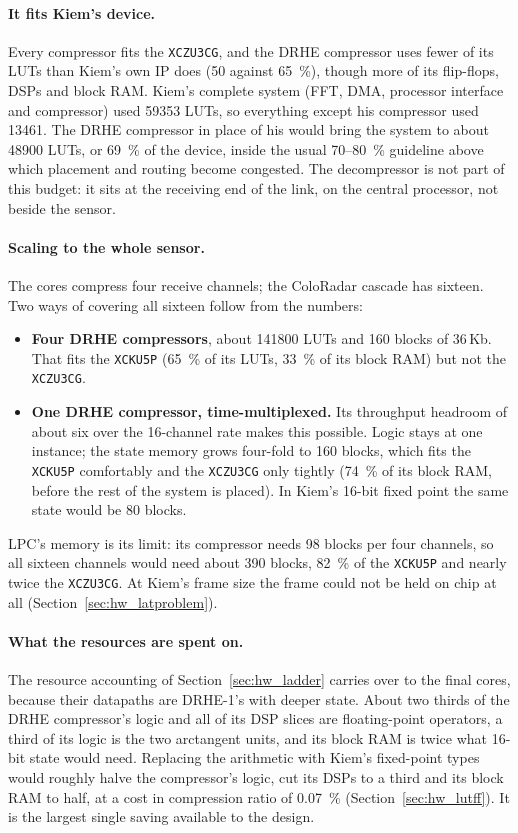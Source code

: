 \paragraph{It fits Kiem's device.} Every compressor fits the \texttt{XCZU3CG},
and the DRHE compressor uses fewer of its LUTs than Kiem's own IP does (50
against \SI{65}{\percent}), though more of its flip-flops, DSPs and block RAM.
Kiem's complete system (FFT, DMA, processor interface and compressor) used
\num{59353} LUTs, so everything except his compressor used \num{13461}. The DRHE
compressor in place of his would bring the system to about \num{48900} LUTs, or
\SI{69}{\percent} of the device, inside the usual 70--\SI{80}{\percent} guideline
above which placement and routing become congested. The decompressor is not
part of this budget: it sits at the receiving end of the link, on the central
processor, not beside the sensor.

\paragraph{Scaling to the whole sensor.} The cores compress four receive
channels; the ColoRadar cascade has sixteen. Two ways of covering all sixteen
follow from the numbers:
\begin{itemize}
\item \textbf{Four DRHE compressors}, about \num{141800} LUTs and 160 blocks of 36\,Kb.
That fits the \texttt{XCKU5P} (\SI{65}{\percent} of its LUTs, \SI{33}{\percent}
of its block RAM) but not the \texttt{XCZU3CG}.
\item \textbf{One DRHE compressor, time-multiplexed.} Its throughput headroom
of about six over the 16-channel rate makes this possible. Logic stays at one
instance; the state memory grows four-fold to 160 blocks, which fits the
\texttt{XCKU5P} comfortably and the \texttt{XCZU3CG} only tightly
(\SI{74}{\percent} of its block RAM, before the rest of the system is placed).
In Kiem's 16-bit fixed point the same state would be 80 blocks.
\end{itemize}
LPC's memory is its limit: its compressor needs 98 blocks per four channels, so
all sixteen channels would need about 390 blocks, \SI{82}{\percent} of the
\texttt{XCKU5P} and nearly twice the \texttt{XCZU3CG}. At Kiem's frame size the
frame could not be held on chip at all (Section~\ref{sec:hw_latproblem}).

\paragraph{What the resources are spent on.} The resource accounting of
Section~\ref{sec:hw_ladder} carries over to the final cores, because their
datapaths are DRHE-1's with deeper state. About two thirds of the DRHE
compressor's logic and all of its DSP slices are floating-point operators, a
third of its logic is the two arctangent units, and its block RAM is twice what
16-bit state would need. Replacing the arithmetic with Kiem's fixed-point types
would roughly halve the compressor's logic, cut its DSPs to a third and its
block RAM to half, at a cost in compression ratio of \SI{0.07}{\percent}
(Section~\ref{sec:hw_lutff}). It is the largest single saving available to the
design.

